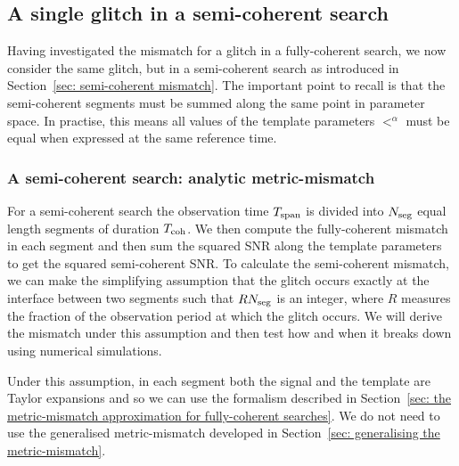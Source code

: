 \documentclass[../full_thesis/full_thesis.tex]{subfiles}
\begin{document}
\subsection{A single glitch in a semi-coherent search}

Having investigated the mismatch for a glitch in a fully-coherent search, we
now consider the same glitch, but in a semi-coherent search as introduced in
Section~\ref{sec: semi-coherent mismatch}. The important
point to recall is that the semi-coherent segments must be summed along the
same point in parameter space. In practise, this means all values of the
template parameters $\lt^{\alpha}$ must be equal when expressed at the same
reference time.

\subsubsection{A semi-coherent search: analytic metric-mismatch}
\label{sec: semi-coherent searches: analytic mismatch}

For a semi-coherent search the observation time $T_{\mathrm{span}}$ is
divided into $N_{\textrm{seg}}$ equal length segments of duration $T_{\mathrm{coh}}$. We then compute
the fully-coherent mismatch in each segment and then sum the squared SNR along the template
parameters to get the squared semi-coherent SNR. To calculate
the semi-coherent mismatch, we can make the simplifying assumption that the
glitch occurs exactly at the interface between two segments such that $RN_{\textrm{seg}}$
is an integer, where $R$ measures the fraction of the observation period at
which the glitch occurs. We will derive the mismatch under this assumption and
then test how and when it breaks down using numerical simulations.

Under this assumption, in each segment both the signal and the template are
Taylor expansions and so we can use the \citet{Brady1998} formalism described
in Section~\ref{sec: the metric-mismatch approximation for fully-coherent
searches}. We do not need to use the generalised metric-mismatch developed in
Section~\ref{sec: generalising the metric-mismatch}.
\end{document}
